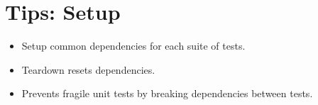 \documentclass{article}
\begin{document}
\sloppy
\section{Tips: Setup}
\begin{itemize}
    \item Setup common dependencies for each suite of tests.
    \item Teardown resets dependencies.
    \item Prevents fragile unit tests by breaking dependencies between tests.
\end{itemize}
\end{document}
